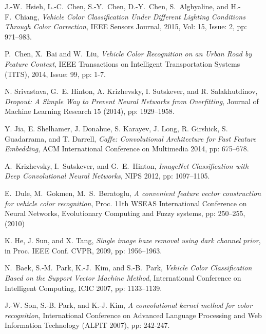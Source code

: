 \documentclass[conference]{IEEEtran}
\begin{document}
%
%
%
\begin{thebibliography}{1}

J.-W.~Hsieh, L.-C.~Chen, S.-Y.~Chen, D.-Y.~Chen, S.~Alghyaline, and H.-F.~Chiang, \emph{Vehicle Color Classification Under Different Lighting Conditions Through Color Correction}, IEEE Sensors Journal, 2015, Vol: 15, Issue: 2, pp: 971--983.

P.~Chen, X.~Bai and W.~Liu, \emph{Vehicle Color Recognition on an Urban Road by Feature Context}, IEEE Transactions on Intelligent Transportation Systems (TITS), 2014, Issue: 99, pp: 1-7.

N. Srivastava, G.~E. Hinton, A. Krizhevsky, I. Sutskever, and R. Salakhutdinov, \emph{Dropout: A Simple Way to Prevent Neural Networks from Overfitting}, Journal of Machine Learning Research 15 (2014), pp: 1929--1958.

Y. Jia, E. Shelhamer, J. Donahue, S. Karayev, J. Long, R. Girshick, S. Guadarrama, and T. Darrell, \emph{Caffe: Convolutional Architecture for Fast Feature Embedding}, ACM International Conference on Multimedia 2014, pp: 675--678.

A.~Krizhevsky, I.~Sutskever, and G.~E.~Hinton, \emph{ImageNet Classification with Deep Convolutional Neural Networks}, NIPS 2012, pp: 1097--1105.

E.~Dule, M.~Gokmen, M.~S.~Beratoglu, \emph{A convenient feature vector construction for vehicle color recognition}, Proc. 11th WSEAS International Conference on Neural Networks, Evolutionary Computing and Fuzzy systems, pp: 250–255, (2010)

K. He, J. Sun, and X. Tang, \emph{Single image haze removal using dark channel prior}, in Proc. IEEE Conf. CVPR, 2009, pp: 1956–1963.

N.~Baek, S.-M.~Park, K.-J.~Kim, and S.-B.~Park, \emph{Vehicle Color Classification Based on the Support Vector Machine Method}, International Conference on Intelligent Computing, {ICIC} 2007, pp: 1133--1139.

J.-W. Son, S.-B. Park, and K.-J. Kim, \emph{A convolutional kernel method for color recognition}, International Conference on Advanced Language Processing and Web Information Technology (ALPIT 2007), pp: 242-247.

\end{thebibliography}




\end{document}
